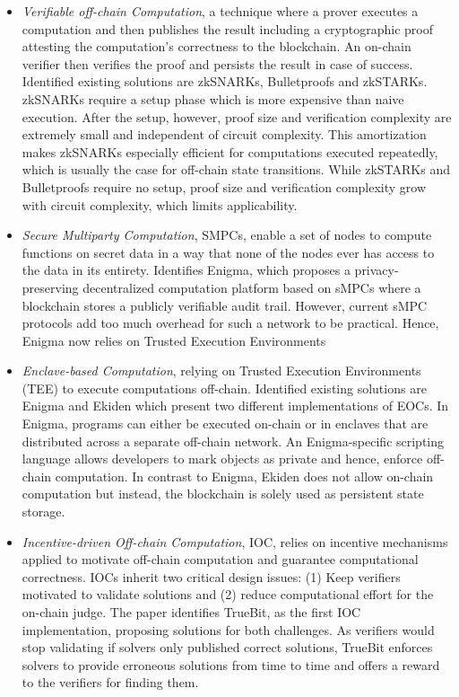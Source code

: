 \begin{itemize}
  \item \textit{Verifiable off-chain Computation}, a technique where a prover executes a computation and then publishes the result including a cryptographic proof attesting the computation’s correctness to the blockchain. An on-chain verifier then verifies the proof and persists the result in case of success. Identified existing solutions are zkSNARKs, Bulletproofs and zkSTARKs. zkSNARKs require a setup phase which is more expensive than naive execution. After the setup, however, proof size and verification complexity are extremely small and independent of circuit complexity. This amortization makes zkSNARKs especially efficient for computations executed repeatedly, which is usually the case for off-chain state transitions. While zkSTARKs and Bulletproofs require no setup, proof size and verification complexity grow with circuit complexity, which limits applicability.
  \item \textit{Secure Multiparty Computation}, SMPCs, enable a set of nodes to compute functions on secret data in a way that none of the nodes ever has access to the data in its entirety. Identifies Enigma, which proposes a privacy-preserving decentralized computation platform based on sMPCs where a blockchain stores a publicly verifiable audit trail. However, current sMPC protocols add too much overhead for such a network to be practical. Hence, Enigma now relies on Trusted Execution Environments
  \item \textit{Enclave-based Computation}, relying on Trusted Execution Environments (TEE) to execute computations off-chain. Identified existing solutions are Enigma and Ekiden which present two different implementations of EOCs. In Enigma, programs can either be executed on-chain or in enclaves that are distributed across a separate off-chain network. An Enigma-specific scripting language allows developers to mark objects as private and hence, enforce off-chain computation. In contrast to Enigma, Ekiden does not allow on-chain computation but instead, the blockchain is solely used as persistent state storage.
  \item \textit{Incentive-driven Off-chain Computation}, IOC, relies on incentive mechanisms applied to motivate off-chain computation and guarantee computational correctness. IOCs inherit two critical design issues: (1) Keep verifiers motivated to validate solutions and (2) reduce computational effort for the on-chain judge. The paper identifies TrueBit, as the first IOC implementation, proposing solutions for both challenges. As verifiers would stop validating if solvers only published correct solutions, TrueBit enforces solvers to provide erroneous solutions from time to time and offers a reward to the verifiers for finding them.
\end{itemize}



